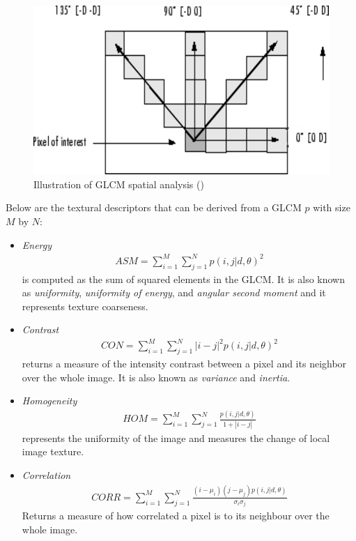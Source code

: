 \begin{figure}[ht!]
\centering
\includegraphics[scale=0.55]{Images/glcm_direction}
\caption{Illustration of GLCM spatial analysis (\cite{REF24})}
\label{fig:columnfigure}
\end{figure}

Below are the textural descriptors that can be derived from a GLCM $p$ with size $M$ by $N$:
\begin{itemize}
\item \textit{Energy}\\
\begin{align*}
ASM = \sum_{i=1}^{M}\sum_{j=1}^{N} p(i,j|d,\theta)^2
\end{align*}
is computed as the sum of squared elements in the GLCM. It is also known as \textit{uniformity}, \textit{uniformity of energy}, and \textit{angular second moment} and it represents texture coarseness.\\

\item \textit{Contrast}\\
\begin{align*}
CON = \sum_{i=1}^{M}\sum_{j=1}^{N} |i-j|^2p(i,j|d,\theta)^2
\end{align*}
returns a measure of the intensity contrast between a pixel and its neighbor over the whole image. It is also known as \textit{variance} and \textit{inertia}.

\item \textit{Homogeneity}\\
\begin{align*}
HOM = \sum_{i=1}^{M}\sum_{j=1}^{N} \frac{p(i,j|d,\theta)}{1 + |i - j|}
\end{align*}
represents the uniformity of the image and measures the change of local image texture.

\item \textit{Correlation}\\
\begin{align*}
CORR = \sum_{i=1}^{M}\sum_{j=1}^{N} \frac{(i -\mu_i)(j - \mu_j)p(i,j|d,\theta)}{\sigma_i\sigma_j}
\end{align*}
Returns a measure of how correlated a pixel is to its neighbour over the whole image.\\

\end{itemize}


